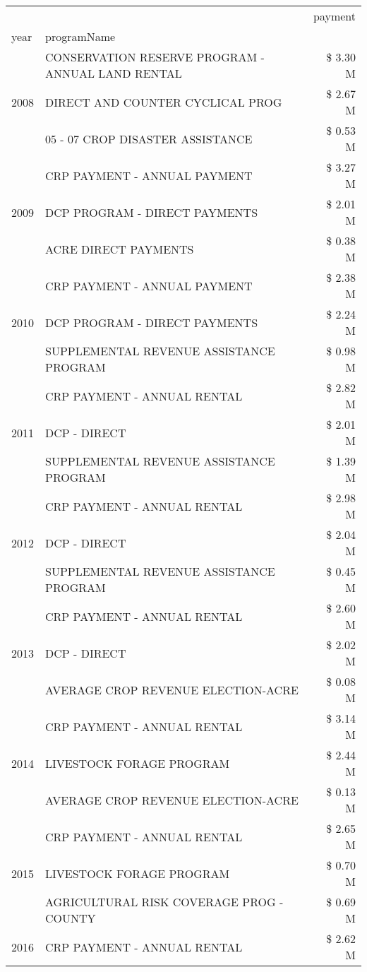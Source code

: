 \begin{tabular}{llr}
\toprule
 &  & payment \\
year & programName &  \\
\midrule
\multirow[t]{3}{*}{2008} & CONSERVATION RESERVE PROGRAM - ANNUAL LAND RENTAL & \$ 3.30 M \\
 & DIRECT AND COUNTER CYCLICAL PROG & \$ 2.67 M \\
 & 05 - 07 CROP DISASTER ASSISTANCE & \$ 0.53 M \\
\cline{1-3}
\multirow[t]{3}{*}{2009} & CRP PAYMENT - ANNUAL PAYMENT & \$ 3.27 M \\
 & DCP PROGRAM - DIRECT PAYMENTS & \$ 2.01 M \\
 & ACRE DIRECT PAYMENTS & \$ 0.38 M \\
\cline{1-3}
\multirow[t]{3}{*}{2010} & CRP PAYMENT - ANNUAL PAYMENT & \$ 2.38 M \\
 & DCP PROGRAM - DIRECT PAYMENTS & \$ 2.24 M \\
 & SUPPLEMENTAL REVENUE ASSISTANCE PROGRAM & \$ 0.98 M \\
\cline{1-3}
\multirow[t]{3}{*}{2011} & CRP PAYMENT - ANNUAL RENTAL & \$ 2.82 M \\
 & DCP - DIRECT & \$ 2.01 M \\
 & SUPPLEMENTAL REVENUE ASSISTANCE PROGRAM & \$ 1.39 M \\
\cline{1-3}
\multirow[t]{3}{*}{2012} & CRP PAYMENT - ANNUAL RENTAL & \$ 2.98 M \\
 & DCP - DIRECT & \$ 2.04 M \\
 & SUPPLEMENTAL REVENUE ASSISTANCE PROGRAM & \$ 0.45 M \\
\cline{1-3}
\multirow[t]{3}{*}{2013} & CRP PAYMENT - ANNUAL RENTAL & \$ 2.60 M \\
 & DCP - DIRECT & \$ 2.02 M \\
 & AVERAGE CROP REVENUE ELECTION-ACRE & \$ 0.08 M \\
\cline{1-3}
\multirow[t]{3}{*}{2014} & CRP PAYMENT - ANNUAL RENTAL & \$ 3.14 M \\
 & LIVESTOCK FORAGE PROGRAM & \$ 2.44 M \\
 & AVERAGE CROP REVENUE ELECTION-ACRE & \$ 0.13 M \\
\cline{1-3}
\multirow[t]{3}{*}{2015} & CRP PAYMENT - ANNUAL RENTAL & \$ 2.65 M \\
 & LIVESTOCK FORAGE PROGRAM & \$ 0.70 M \\
 & AGRICULTURAL RISK COVERAGE PROG - COUNTY & \$ 0.69 M \\
\cline{1-3}
\multirow[t]{3}{*}{2016} & CRP PAYMENT - ANNUAL RENTAL & \$ 2.62 M \\

\end{tabular}
